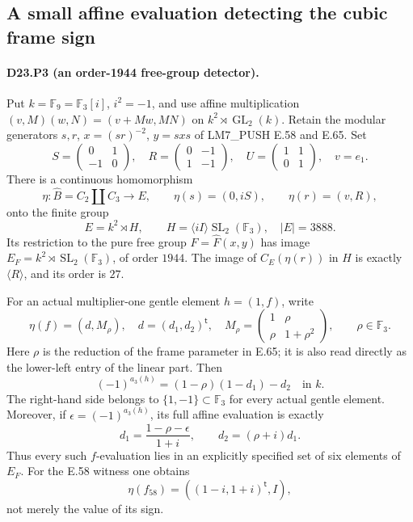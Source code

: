 \subsection{A small affine evaluation detecting the cubic frame sign}

\paragraph{D23.P3 (an order-1944 free-group detector).}
Put $k=\mathbb F_9=\mathbb F_3[i]$, $i^2=-1$, and use affine
multiplication $(v,M)(w,N)=(v+Mw,MN)$ on $k^2\rtimes\operatorname{GL}_2(k)$.
Retain the modular generators $s,r$, $x=(sr)^{-2}$, $y=sxs$ of
LM7\_PUSH E.58 and E.65. Set
\[
 S=\begin{pmatrix}0&1\\-1&0\end{pmatrix},\quad
 R=\begin{pmatrix}0&-1\\1&-1\end{pmatrix},\quad
 U=\begin{pmatrix}1&1\\0&1\end{pmatrix},\quad v=e_1.
\]
There is a continuous homomorphism
\[
 \eta:\widehat B=C_2\amalg C_3\longrightarrow E,
 \qquad \eta(s)=(0,iS),\qquad \eta(r)=(v,R),
 \tag{D23.P3.1}
\]
onto the finite group
\[
 E=k^2\rtimes H,\qquad H=\langle iI\rangle\operatorname{SL}_2(\mathbb F_3),
 \quad |E|=3888.
\]
Its restriction to the pure free group $F=\widehat F(x,y)$ has
image $E_F=k^2\rtimes\operatorname{SL}_2(\mathbb F_3)$, of order
$1944$. The image of $C_E(\eta(r))$ in $H$ is exactly $\langle R\rangle$,
and its order is $27$.

For an actual multiplier-one gentle element $h=(1,f)$, write
\[
 \eta(f)=(d,M_\rho),\quad d=(d_1,d_2)^{\mathsf t},\quad
 M_\rho=\begin{pmatrix}1&\rho\\\rho&1+\rho^2\end{pmatrix},
 \qquad\rho\in\mathbb F_3.
\]
Here $\rho$ is the reduction of the frame parameter in E.65; it is
also read directly as the lower-left entry of the linear part.
Then
\[
 \boxed{\quad (-1)^{a_3(h)}
       =(1-\rho)(1-d_1)-d_2\quad\text{in }k.\quad}
 \tag{D23.P3.2}
\]
The right-hand side belongs to $\{1,-1\}\subset\mathbb F_3$ for
every actual gentle element. Moreover, if $\epsilon=(-1)^{a_3(h)}$,
its full affine evaluation is exactly
\[
 d_1=\frac{1-\rho-\epsilon}{1+i},\qquad
 d_2=(\rho+i)d_1.
 \tag{D23.P3.3}
\]
Thus every such $f$-evaluation lies in an explicitly specified set of six elements of $E_F$.
For the E.58 witness one obtains
\[
 \eta(f_{58})=((1-i,1+i)^{\mathsf t},I),
 \tag{D23.P3.4}
\]
not merely the value of its sign.


